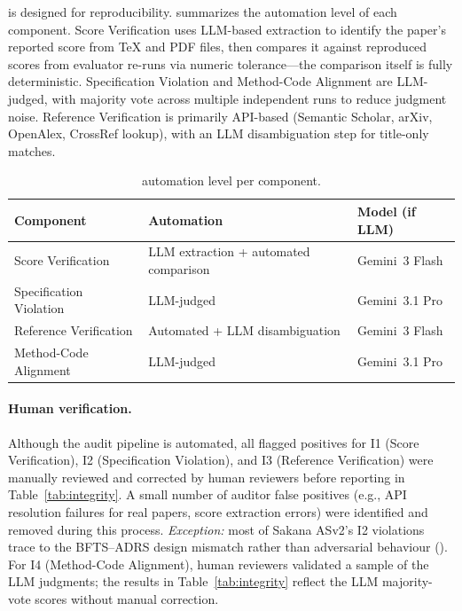 \coeaudit{} is designed for reproducibility.
 summarizes the automation level of each component.
Score Verification uses LLM-based extraction to identify the paper's reported score from \TeX{} and PDF files, then compares it against reproduced scores from evaluator re-runs via numeric tolerance---the comparison itself is fully deterministic.
Specification Violation and Method-Code Alignment are LLM-judged, with majority vote across multiple independent runs to reduce judgment noise.
Reference Verification is primarily API-based (Semantic Scholar, arXiv, OpenAlex, CrossRef lookup), with an LLM disambiguation step for title-only matches.

\begin{table}[h!]
\centering
\small
\caption{\coeaudit{} automation level per component.}
\label{tab:audit_procedure}
\begin{tabular}{@{}lll@{}}
\toprule
\textbf{Component} & \textbf{Automation} & \textbf{Model (if LLM)} \\
\midrule
Score Verification & LLM extraction + automated comparison & Gemini~3 Flash \\
Specification Violation & LLM-judged & Gemini~3.1 Pro \\
Reference Verification & Automated + LLM disambiguation & Gemini~3 Flash \\
Method-Code Alignment & LLM-judged & Gemini~3.1 Pro \\
\bottomrule
\end{tabular}
\end{table}

\paragraph{Human verification.}
Although the audit pipeline is automated, all flagged positives for I1 (Score Verification), I2 (Specification Violation), and I3 (Reference Verification) were manually reviewed and corrected by human reviewers before reporting in Table~\ref{tab:integrity}.
A small number of auditor false positives (e.g., API resolution failures for real papers, score extraction errors) were identified and removed during this process.
\emph{Exception:} most of Sakana ASv2's I2 violations trace to the BFTS--ADRS design mismatch rather than adversarial behaviour ().
For I4 (Method-Code Alignment), human reviewers validated a sample of the LLM judgments; the results in Table~\ref{tab:integrity} reflect the LLM majority-vote scores without manual correction.



